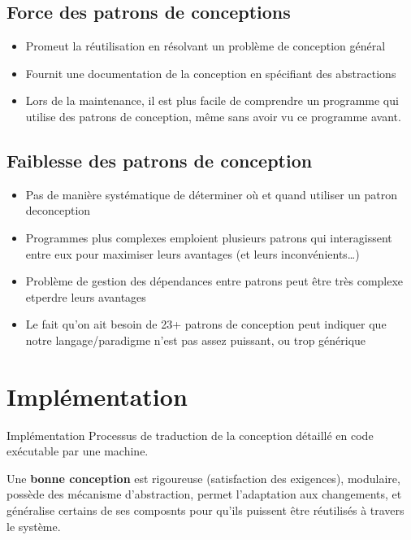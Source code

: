 \documentclass[16pt]{report}
\begin{document}
\begin{multicols*}{2}
    \section{Force des patrons de conceptions}

    \begin{itemize}
        \item Promeut la réutilisation en résolvant un problème de conception général
        \item Fournit une documentation de la conception en spécifiant des abstractions
        \item Lors de la maintenance, il est plus facile de comprendre un programme 
            qui utilise des patrons de conception, même sans avoir vu ce programme avant. 
    \end{itemize}

    \section{Faiblesse des patrons de conception}

    \begin{itemize}
        \item Pas de manière systématique de déterminer où et quand utiliser
            un patron deconception
        \item Programmes plus complexes emploient plusieurs patrons qui interagissent 
            entre eux pour maximiser leurs avantages (et leurs inconvénients…)
        \item Problème de gestion des dépendances entre patrons peut être 
            très complexe etperdre leurs avantages
        \item Le fait qu’on ait besoin de 23+ patrons de conception peut indiquer que notre 
            langage/paradigme n’est pas assez puissant, ou trop générique


    \end{itemize}
        

    \chapter{Implémentation}

    \begin{Definitionx}{Implémentation}{}
        Processus de traduction de la conception détaillé en code exécutable par une machine. 
    \end{Definitionx}
    \pagebreak


    \begin{note}{}{}
        Une \textbf{bonne conception} est rigoureuse (satisfaction des exigences), modulaire, 
        possède des mécanisme d'abstraction, permet l'adaptation aux changements, et généralise certains 
        de ses composnts pour qu'ils puissent être réutilisés à travers le système. 
    \end{note}


\end{multicols*}
\end{document}
